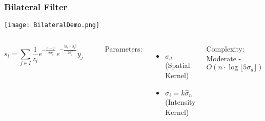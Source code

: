 \documentclass{beamer}
\begin{document}
\begin{frame}
\begin{center}
\frametitle{Bilateral Filter}

\texttt{[image: BilateralDemo.png]}

\begin{columns}[c]

\column{2.25 in}
\centering

\begin{displaymath}
s_i = \sum _{j \in I} \frac{1}{z_i} e^{-\frac{\lvert i - j \rvert}{2 \sigma_d^2}}e^{-\frac{\lvert y_i - y_j \rvert}{2 \sigma_i^2}} y_j
\end{displaymath}

$ $\\

\column{3.25 in}
\justifying

Parameters:

\begin{itemize}

\item $\sigma_d$ (Spatial Kernel)

\item $\sigma_i = k \hat{\sigma}_n$ (Intensity Kernel)

\end{itemize}

Complexity: Moderate - $O \left( n \cdot \log \lfloor 5 \sigma_d \rfloor \right)$\\

\end{columns}

\end{center}
\end{frame}

\end{document}
